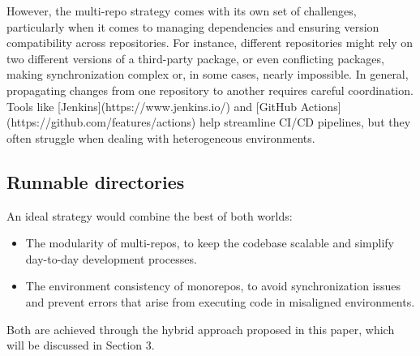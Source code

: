 \documentclass{article}
\begin{document}
However, the multi-repo strategy comes with its own set of challenges,
particularly when it comes to managing dependencies and ensuring version
compatibility across repositories. For instance, different repositories might
rely on two different versions of a third-party package, or even conflicting
packages, making synchronization complex or, in some cases, nearly impossible.
In general, propagating changes from one repository to another requires careful
coordination. Tools like [Jenkins](https://www.jenkins.io/) and
[GitHub Actions](https://github.com/features/actions) help streamline CI/CD
pipelines, but they often struggle when dealing with heterogeneous environments.

\subsection{Runnable directories}

An ideal strategy would combine the best of both worlds:

\begin{itemize}

  \item The modularity of multi-repos, to keep the codebase scalable and
    simplify day-to-day development processes.

  \item The environment consistency of monorepos, to avoid synchronization
    issues and prevent errors that arise from executing code in misaligned
    environments.
\end{itemize}

Both are achieved through the hybrid approach proposed in this paper, which will
be discussed in Section 3.
\end{document}
